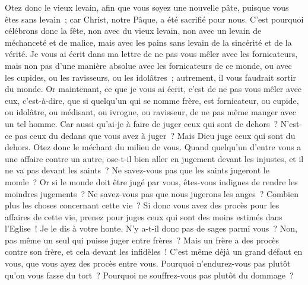 \begin{multicols}{2}
Otez donc le vieux levain, afin que vous soyez une nouvelle pâte, puisque vous êtes sans levain~; car Christ, notre Pâque, a été sacrifié pour nous.
C'est pourquoi célébrons donc la fête, non avec du vieux levain, non avec un levain de méchanceté et de malice, mais avec les pains sans levain de la sincérité et de la vérité.
Je vous ai écrit dans ma lettre de ne pas vous mêler avec les fornicateurs,
mais non pas d'une manière absolue avec les fornicateurs de ce monde, ou avec les cupides, ou les ravisseurs, ou les idolâtres~; autrement, il vous faudrait sortir du monde.
Or maintenant, ce que je vous ai écrit, c'est de ne pas vous mêler avec eux, c'est-à-dire, que si quelqu'un qui se nomme frère, est fornicateur, ou cupide, ou idolâtre, ou médisant, ou ivrogne, ou ravisseur, de ne pas même manger avec un tel homme.
Car aussi qu'ai-je à faire de juger ceux qui sont de dehors~? N'est-ce pas ceux du dedans que vous avez à juger~?
Mais Dieu juge ceux qui sont du dehors. Otez donc le méchant du milieu de vous.
\VerseOne{}Quand quelqu'un d'entre vous a une affaire contre un autre, ose-t-il bien aller en jugement devant les injustes, et il ne va pas devant les saints~?
Ne savez-vous pas que les saints jugeront le monde~? Or si le monde doit être jugé par vous, êtes-vous indignes de rendre les moindres jugements~?
Ne savez-vous pas que nous jugerons les anges~? Combien plus les choses concernant cette vie~?
Si donc vous avez des procès pour les affaires de cette vie, prenez pour juges ceux qui sont des moins estimés dans l'Eglise~!
Je le dis à votre honte. N'y a-t-il donc pas de sages parmi vous~? Non, pas même un seul qui puisse juger entre frères~?
Mais un frère a des procès contre son frère, et cela devant les infidèles~!
C'est même déjà un grand défaut en vous, que vous ayez des procès entre vous. Pourquoi n'endurez-vous pas plutôt qu'on vous fasse du tort~? Pourquoi ne souffrez-vous pas plutôt du dommage~? 

\end{multicols}
